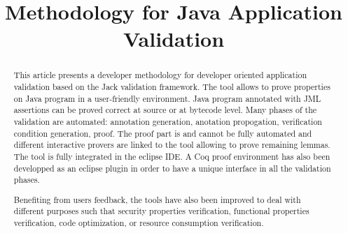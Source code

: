 \documentclass{llncs}
\title{Methodology for Java Application Validation}
\author{}
\begin{document}
\maketitle      
\begin{abstract}
This article presents a developer
methodology for developer oriented application validation based on 
the Jack validation framework. The tool allows to prove properties on
Java program in a user-friendly environment. Java program annotated
with JML assertions can be proved correct at source or at bytecode
level. Many phases of the validation are automated: annotation
generation, anotation propogation, verification condition generation,
proof. The proof part is and cannot be fully automated and different
interactive provers are linked to the tool allowing to prove remaining
lemmas. The tool is fully integrated in the eclipse IDE. A Coq proof
environment has also been developped as an eclipse plugin in order to
have a unique interface in all the validation phases.

Benefiting from users feedback, the tools have also been improved
to deal with different purposes such that security properties
verification, functional properties verification, code optimization,
or resource consumption verification.
\end{abstract}
        
        





\end{document}
